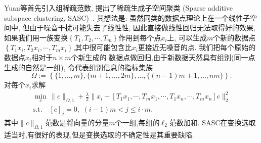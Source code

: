Yuan等首先引入组稀疏范数, 提出了稀疏生成子空间聚类
(Sparse additive subspace clustering, SASC)~\cite{yuan2014sparse}.
其想法是: 虽然同类的数据点理论上在一个线性子空间中,
但由于噪音干扰可能失去了线性性, 因此直接做线性回归无法取得好的效果,
如果我们用一族变换\(\left\{T_1, T_2, \cdots, T_m\right\}\)作用到每个点\(x_i\)上,
可以生成\(m\)个新的数据点\(\left\{ T_1 x_i, T_2 x_i,\cdots,
T_m x_i \right\}\),其中很可能包含比\(x_i\)更接近无噪音的点. 
我们把每个原始的数据点\(x_i\)相对于\(n\times m\)个新生成的
数据点做回归,由于新数据天然具有组别(同一点生成的自然是一组),
令代表组别信息的指标集族
\begin{equation*}
  \Omega:= \left\{ \{1,\ldots, m\}, \{m+1, \ldots, 2m\}, \ldots, \{(n-1)m+1,
  \ldots, nm\}\right\}.
\end{equation*}
对每个\(x_i\)求解
\begin{equation}
  \begin{gathered}
    \min_{c}\, \|c\|_{\Omega, 1}+\frac{\lambda}{2}\|x_i-\left[ 
      T_1 x_1, \cdots, T_m x_1,\cdots, T_1 x_n, \cdots, T_m x_n
    \right] c\|_2^2 \\
    \text{s.t.} \quad [c]_j = 0,\,\, (i-1)m < j \le i\cdot m,
  \end{gathered}
  \label{eq:sasc}
\end{equation}
其中\(\|c\|_{\Omega, 1}\)范数是将向量的分量\(m\)个一组,每组的\(\ell_2\)范数加和.
SASC在变换选取适当时,有很好的表现,但是变换选取的不确定性是其重要缺陷.
